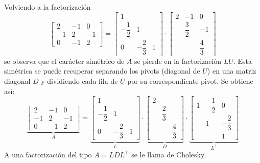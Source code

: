 Volviendo a la factorización \[ \begin{bmatrix}
	2 & -1 & 0 \\
	-1 & 2 & -1 \\
	0 & -1 & 2
\end{bmatrix}=\begin{bmatrix}
1 &  & \\
-\dfrac{1}{2} & 1 &  \\
0 & -\dfrac{2}{3} & 1
\end{bmatrix}\cdot\begin{bmatrix}
2 & -1 & 0 \\ 
 & \dfrac{3}{2} & -1 \\ 
 &  & \dfrac{4}{3}
\end{bmatrix}\]se observa que el carácter simétrico de $A$ se pierde en la factorización $LU$. Esta simétrica se puede recuperar separando los pivots (diagonal de $U$) en una matriz diagonal $D$ y dividiendo cada fila de $U$ por su correspondiente pivot. Se obtiene así: \[ \underbrace{\begin{bmatrix}
	2 & -1 & 0 \\
	-1 & 2 & -1 \\
	0 & -1 & 2
	\end{bmatrix}}_A=\underbrace{\begin{bmatrix}
	1 &  & \\
	-\dfrac{1}{2} & 1 &  \\
	0 & -\dfrac{2}{3} & 1
\end{bmatrix}}_L\cdot\underbrace{\begin{bmatrix}
2 & & \\
& \dfrac{2}{3} & \\
 & & \dfrac{4}{3}
\end{bmatrix}}_D\cdot\underbrace{\begin{bmatrix}
1 & -\dfrac{1}{2} &0  \\
 & 1 & -\dfrac{2}{3} \\
&  & 1
\end{bmatrix}}_{L^\intercal} \]
A una factorización del tipo $A=LDL^\intercal$ se le llama de Cholesky.

